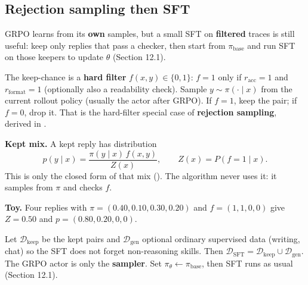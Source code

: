 


\subsection{Rejection sampling then SFT}

GRPO learns from its \textbf{own} samples, but a small SFT on \textbf{filtered} traces is still useful: keep only replies that pass a checker, then start from $\pi_{\mathrm{base}}$ and run SFT on those keepers to update $\theta$ (Section 12.1).

The keep-chance is a \textbf{hard filter} $f(x,y)\in\{0,1\}$: $f=1$ only if $r_{\mathrm{acc}}=1$ and $r_{\mathrm{format}}=1$ (optionally also a readability check). Sample $y\sim\pi(\cdot\mid x)$ from the current rollout policy (usually the actor after GRPO). If $f=1$, keep the pair; if $f=0$, drop it. That is the hard-filter special case of \textbf{rejection sampling}, derived in .

\begin{asidenote}[Note]
\textbf{Kept mix.} A kept reply has distribution \[
p(y\mid x)
=
\frac{\pi(y\mid x)\,f(x,y)}{Z(x)},
\qquad
Z(x)=P(f=1\mid x).
\] This is only the closed form of that mix (). The algorithm never uses it: it samples from $\pi$ and checks $f$.

\textbf{Toy.} Four replies with $\pi=(0.40,0.10,0.30,0.20)$ and $f=(1,1,0,0)$ give $Z=0.50$ and $p=(0.80,0.20,0,0)$.

\end{asidenote}

Let $\mathcal{D}_{\mathrm{keep}}$ be the kept pairs and $\mathcal{D}_{\mathrm{gen}}$ optional ordinary supervised data (writing, chat) so the SFT does not forget non-reasoning skills. Then $\mathcal{D}_{\mathrm{SFT}}=\mathcal{D}_{\mathrm{keep}}\cup\mathcal{D}_{\mathrm{gen}}$. The GRPO actor is only the \textbf{sampler}. Set $\pi_\theta\leftarrow\pi_{\mathrm{base}}$, then SFT runs as usual (Section 12.1).

